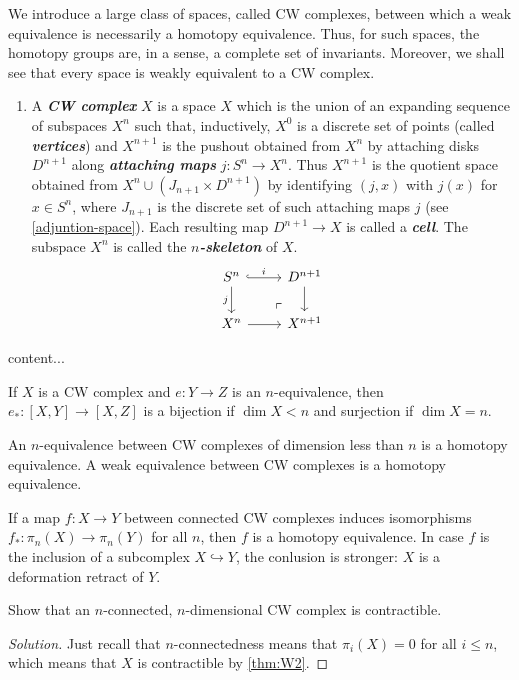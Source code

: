 \documentclass{article}
\begin{document}
We introduce a large class of spaces, called CW complexes, between which a weak equivalence is necessarily a homotopy equivalence. Thus, for such spaces, the homotopy groups are, in a sense, a complete set of invariants. Moreover, we shall see that every space is weakly equivalent to a CW complex.
\begin{defn}\label{defn:CW-complex}\leavevmode
	\begin{enumerate}
		\item A \textbf{\textit{CW complex}} $X$ is a space $X$ which is the union of an expanding sequence of subspaces $X^n$ such that, inductively, $X^0$ is a discrete set of points (called \textbf{\textit{vertices}}) and $X^{n+1}$ is the pushout obtained from $X^n$ by attaching disks $D^{n+1}$ along \textbf{\textit{attaching maps}} $j:S^n\to X^n$. {\color{cyan}Thus $X^{n+1}$ is the quotient space obtained from $X^n\cup(J_{n+1}\times D^{n+1})$ by identifying $(j,x)$ with $j(x)$ for $x\in S^n$, where $J_{n+1}$ is the discrete set of such attaching maps $j$ (see \cref{adjuntion-space})}. Each resulting map $D^{n+1}\to X$ is called a \textbf{\textit{cell}}. The subspace $X^n$ is called the \textbf{\textit{$n$-skeleton}} of $X$.
			\[\begin{tikzcd}
			S^n\arrow[r,"i",hook]\arrow[d,swap,"j"]&D^{n+1}\arrow[d,]\\
			X^n\arrow[r]&X^{n+1}\arrow[ul, phantom, "\ulcorner", very near start]
		\end{tikzcd}\]
	\end{enumerate}
\end{defn}
\begin{lemma}[HELP]
	content...
\end{lemma}
\begin{thm}
	If $X$ is a CW complex and $e:Y\to Z$ is an $n$-equivalence, then $e_*:[X,Y]\to[X,Z]$ is a bijection if $\dim X<n$ and surjection if $\dim X=n$.
\end{thm}
\begin{thm}\label{thm:W2}
	An $n$-equivalence between CW complexes of dimension less than $n$ is a homotopy equivalence. A weak equivalence between CW complexes is a homotopy equivalence.
\end{thm}
\begin{thm}
	If a map $f:X\to Y$ between connected CW complexes induces isomorphisms $f_*:\pi_n(X)\to\pi_n(Y)$ for all $n$, then $f$ is a homotopy equivalence. In case $f$ is the inclusion of a subcomplex $X\hookrightarrow Y$, the conlusion is stronger: $X$ is a deformation retract of $Y$.
\end{thm}
\begin{exercise}[Hatcher 4.1.12]
	Show that an $n$-connected, $n$-dimensional CW complex is contractible.
\end{exercise}
\begin{proof}[Solution]
	Just recall that $n$-connectedness means that $\pi_i(X)=0$ for all $i\leq n$, which means that $X$ is contractible by \cref{thm:W2}.
\end{proof}
\end{document}
